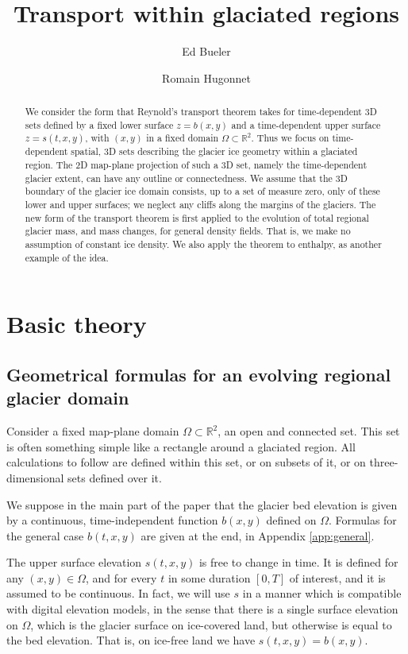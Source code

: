 \documentclass[11pt]{amsart}
\title[Transport within glaciated regions]{Transport within glaciated regions}
\author{Ed Bueler}
\author{Romain Hugonnet}
\theoremstyle{definition}
\newcommand{\RR}{\mathbb{R}}
\begin{document}
\begin{abstract}
We consider the form that Reynold's transport theorem \cite{Holmes2019} takes for time-dependent 3D sets defined by a fixed lower surface $z=b(x,y)$ and a time-dependent upper surface $z=s(t,x,y)$, with $(x,y)$ in a fixed domain $\Omega\subset\RR^2$.  Thus we focus on time-dependent spatial, 3D sets describing the glacier ice geometry within a glaciated region.  The 2D map-plane projection of such a 3D set, namely the time-dependent glacier extent, can have any outline or connectedness.  We assume that the 3D boundary of the glacier ice domain consists, up to a set of measure zero, only of these lower and upper surfaces; we neglect any cliffs along the margins of the glaciers.  The new form of the transport theorem is first applied to the evolution of total regional glacier mass, and mass changes, for general density fields.  That is, we make no assumption of constant ice density.  We also apply the theorem to enthalpy, as another example of the idea.
\end{abstract}

\maketitle

\section{Basic theory} \label{sec:basic}

\subsection{Geometrical formulas for an evolving regional glacier domain}  Consider a fixed map-plane domain $\Omega \subset \RR^2$, an open and connected set.  This set is often something simple like a rectangle around a glaciated region.  All calculations to follow are defined within this set, or on subsets of it, or on three-dimensional sets defined over it.

We suppose in the main part of the paper that the glacier bed elevation is given by a continuous, time-independent function $b(x,y)$ defined on $\Omega$.  Formulas for the general case $b(t,x,y)$ are given at the end, in Appendix \ref{app:general}.

The upper surface elevation $s(t,x,y)$ is free to change in time.  It is defined for any $(x,y)\in \Omega$, and for every $t$ in some duration $[0,T]$ of interest, and it is assumed to be continuous.  In fact, we will use $s$ in a manner which is compatible with digital elevation models, in the sense that there is a single surface elevation on $\Omega$, which is the glacier surface on ice-covered land, but otherwise is equal to the bed elevation.  That is, on ice-free land we have $s(t,x,y) = b(x,y)$.
\end{document}
